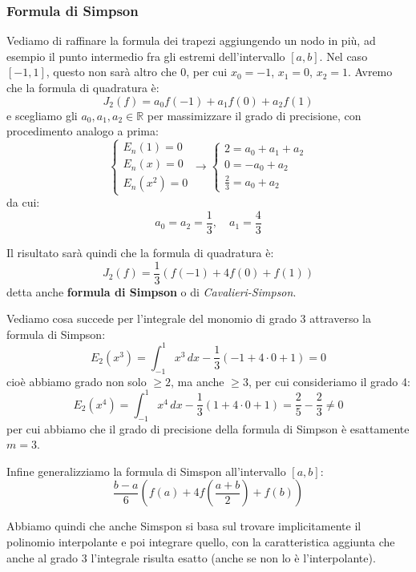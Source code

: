 \documentclass[a4paper,11pt]{article}
\begin{document}
\subsubsection{Formula di Simpson}

Vediamo di raffinare la formula dei trapezi aggiungendo un nodo in più, ad esempio il punto intermedio fra gli estremi dell'intervallo $[a, b]$.
Nel caso $[-1, 1]$, questo non sarà altro che $0$, per cui $x_0 = -1$, $x_1 = 0$, $x_2 = 1$.
Avremo che la formula di quadratura è:
$$
J_2 (f) = a_0 f(-1) + a_1 f(0) + a_2 f(1)
$$
e scegliamo gli $a_0, a_1, a_2 \in \mathbb{R}$ per massimizzare il grado di precisione, con procedimento analogo a prima:
$$
	\begin{cases}
		E_n(1) = 0 \\	
		E_n(x) = 0 \\	
		E_n(x^2) = 0	
	\end{cases}
	\rightarrow
	\begin{cases}
		2 = a_0 + a_1 + a_2 \\
		0 = -a_0 + a_2 \\
		\frac{2}{3} = a_0 + a_2
	\end{cases}
$$
da cui:
$$
a_0 = a_2 = \frac{1}{3}, \quad a_1 = \frac{4}{3}
$$

Il risultato sarà quindi che la formula di quadratura è:
$$
J_2(f) = \frac{1}{3} \left( f(-1) + 4 f(0) + f(1) \right)
$$
detta anche \textbf{formula di Simpson} o di \textit{Cavalieri-Simpson}.

Vediamo cosa succede per l'integrale del monomio di grado 3 attraverso la formula di Simpson:
$$
E_2 (x^3) = \int_{-1}^1 x^3 \, dx - \frac{1}{3} \left( -1 + 4 \cdot 0 + 1 \right) = 0
$$
cioè abbiamo grado non solo $\geq 2$, ma anche $\geq 3$, per cui consideriamo il grado 4:
$$
E_2 (x^4) = \int_{-1}^1 x^4 \, dx - \frac{1}{3} \left( 1 + 4 \cdot 0 + 1 \right) = \frac{2}{5} - \frac{2}{3} \neq 0
$$
per cui abbiamo che il grado di precisione della formula di Simpson è esattamente $m = 3$.

Infine generalizziamo la formula di Simspon all'intervallo $[a, b]$:
$$
\frac{b - a}{6} \left( f(a) + 4 f\left( \frac{a + b}{2} \right) + f(b) \right)
$$

Abbiamo quindi che anche Simspon si basa sul trovare implicitamente il polinomio interpolante e poi integrare quello, con la caratteristica aggiunta che anche al grado 3 l'integrale risulta esatto (anche se non lo è l'interpolante).

\par\smallskip
\end{document}
